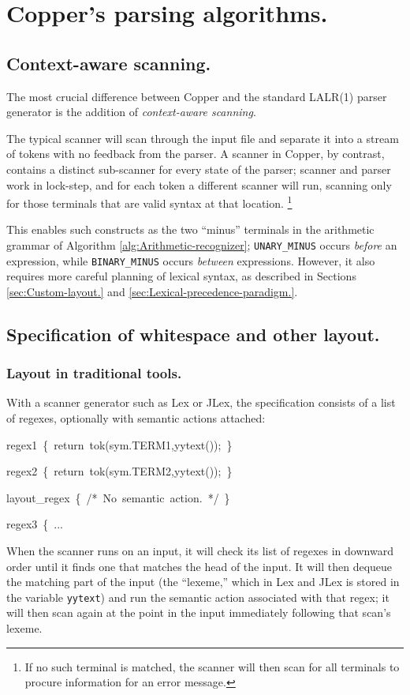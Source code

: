 \documentclass[12pt,english,twoside]{report}
\newenvironment{codeblock}
{\begin{list}{}{
\setlength{\rightmargin}{\leftmargin}
\setlength{\listparindent}{0pt}%
\raggedright
\setlength{\itemsep}{0pt}
\setlength{\parsep}{0pt}
\normalfont\ttfamily}%
 \item[]}
{\end{list}}
\newcommand\sectionname{Section}
\begin{document}
\chapter{\label{cha:Copper's-parsing-algorithms.}Copper's parsing algorithms.}


\section{Context-aware scanning.}

The most crucial difference between Copper and the standard LALR(1)
parser generator is the addition of \emph{context-aware scanning}.

The typical scanner will scan through the input file and separate
it into a stream of tokens with no feedback from the parser. A scanner
in Copper, by contrast, contains a distinct sub-scanner for every
state of the parser; scanner and parser work in lock-step, and for
each token a different scanner will run, scanning only for those terminals
that are valid syntax at that location.%
\footnote{If no such terminal is matched, the scanner will then scan for all
terminals to procure information for an error message.%
}

This enables such constructs as the two {}``minus'' terminals in
the arithmetic grammar of Algorithm \ref{alg:Arithmetic-recognizer};
\texttt{UNARY\_MINUS} occurs \emph{before} an expression, while \texttt{BINARY\_MINUS}
occurs \emph{between} expressions. However, it also requires more
careful planning of lexical syntax, as described in \sectionname{}s
\ref{sec:Custom-layout.} and \ref{sec:Lexical-precedence-paradigm.}.


\section{\label{sec:Custom-layout.}Specification of whitespace and other
layout.}


\subsection{Layout in traditional tools.}

With a scanner generator such as Lex or JLex, the specification consists
of a list of regexes, optionally with semantic actions attached:

\begin{codeblock}
regex1~\{~return~tok(sym.TERM1,yytext());~\}

regex2~\{~return~tok(sym.TERM2,yytext());~\}

layout\_regex~\{~/{*}~No~semantic~action.~{*}/~\}

regex3~\{~...


\end{codeblock}
When the scanner runs on an input, it will check its list of regexes
in downward order until it finds one that matches the head of the
input. It will then dequeue the matching part of the input (the {}``lexeme,''
which in Lex and JLex is stored in the variable \texttt{yytext}) and
run the semantic action associated with that regex; it will then scan
again at the point in the input immediately following that scan's
lexeme.
\end{document}
